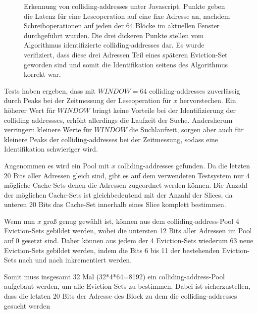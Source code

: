 \label{fig:colliding_addresses_js_measurement}
\begin{figure}[h]
\centering
\begin{scaletikzpicturetowidth}{\textwidth}

\end{scaletikzpicturetowidth}
\caption{Erkennung von colliding-addresses unter Javascript. Punkte geben die Latenz für eine Leseoperation auf eine fixe Adresse an, nachdem Schreiboperationen auf jeden der 64 Blöcke im aktuellen Fenster durchgeführt wurden. Die drei dickeren Punkte stellen vom Algorithmus identifizierte colliding-addresses dar. Es wurde verifiziert, dass diese drei Adressen Teil eines späteren Eviction-Set geworden sind und somit die Identifikation seitens des Algorithmus korrekt war.}
\end{figure}

Tests haben ergeben, dass mit $WINDOW=64$ colliding-addresses zuverlässig durch Peaks bei der Zeitmessung der Leseoperation für $x$ hervorstechen.
Ein höherer Wert für $WINDOW$ bringt keine Vorteile bei der Identifizierung der colliding addressses, erhöht allerdings die Laufzeit der Suche.
Andersherum verringern kleinere Werte für $WINDOW$ die Suchlaufzeit, sorgen aber auch für kleinere Peaks der colliding-addresses bei der Zeitmessung, sodass eine Identifikation schwieriger wird.

Angenommen es wird ein Pool mit $x$ colliding-addresses gefunden.
Da die letzten 20 Bits aller Adressen gleich sind, gibt es auf dem verwendeten Testsystem nur 4 mögliche Cache-Sets denen die Adressen zugeordnet werden können.
Die Anzahl der möglichen Cache-Sets ist gleichbedeutend mit der Anzahl der Slices, da unteren 20 Bits das Cache-Set innerhalb eines Slice komplett bestimmen.

Wenn nun $x$ groß genug gewählt ist, können aus dem colliding-address-Pool 4 Eviction-Sets gebildet werden, wobei die untersten 12 Bits aller Adressen im Pool auf 0 gesetzt sind. Daher können aus jedem der 4 Eviction-Sets wiederum 63 neue Eviction-Sets gebildet werden, indem die Bits 6 bis 11 der bestehenden Eviction-Sets nach und nach inkrementiert werden.

Somit muss insgesamt 32 Mal (32*4*64=8192) ein colliding-address-Pool aufgebaut werden, um alle Eviction-Sets zu bestimmen.
Dabei ist sicherzustellen, dass die letzten 20 Bits der Adresse des Block zu dem die colliding-addresses gesucht werden 


